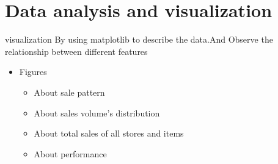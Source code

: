 \documentclass[
 size=12pt,
 paper=smartboard, %
 mode=present, %
 display=slides, %
style=tuliplab,
pauseslide,
fleqn,leqno]{powerdot}
\begin{document}

\section{Data analysis and visualization}
\begin{slide}{visualization}
By using matplotlib to describe the data.And Observe the relationship between different features
\vspace{1.5cm}
\begin{itemize}
  \item Figures
  \begin{itemize}
    \item About sale pattern
    \item About sales volume’s distribution
    \item About total sales of all stores and items
    \item About  performance
  \end{itemize}
\end{itemize}
\end{slide}
\end{document}

